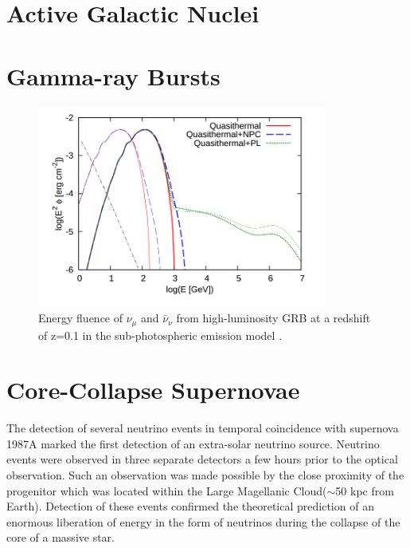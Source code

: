 \documentclass{gatech-thesis}
\begin{document}
\section{Active Galactic Nuclei}

\section{Gamma-ray Bursts}


\begin{figure}[ht]
  \begin{center}
    \includegraphics[width=0.85\textwidth,keepaspectratio]{SubPhotoFluence.png}
  \end{center}
  \caption{Energy fluence of $\nu_{\mu}$ and $\bar{\nu}_{\nu}$ from high-luminosity GRB at a redshift of z=0.1 in the sub-photospheric emission model \cite{2013PhRvL.111m1102M}.}
  \label{fig:subphotospheric_nus}
\end{figure}

\section{Core-Collapse Supernovae}
The detection of several neutrino events in temporal coincidence with supernova 1987A marked the first detection of an extra-solar neutrino source. Neutrino events were observed in three separate detectors a few hours prior to the optical observation. Such an observation was made possible by the close proximity of the progenitor which was located within the Large Magellanic Cloud($\sim$50 kpc from Earth). Detection of these events confirmed the theoretical prediction of an enormous liberation of energy in the form of neutrinos during the collapse of the core of a massive star.
\end{document}
